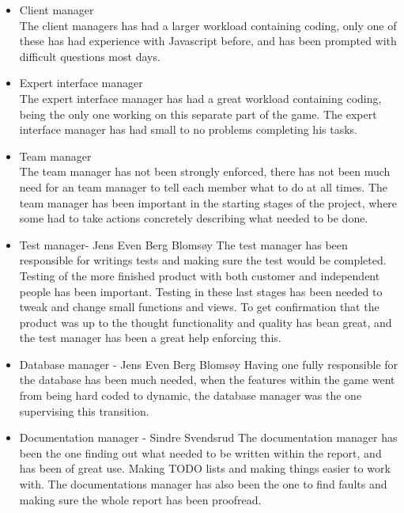 \begin{itemize}
	\item Client manager\\
The client managers has had a larger workload containing coding, only one of these has had experience with Javascript before, and has been prompted with difficult questions most days.
	\item Expert interface manager\\
The expert interface manager has had a great workload containing coding, being the only one working on this separate part of the game. The expert interface manager has had small to no problems completing his tasks.
	\item Team manager\\
The team manager has not been strongly enforced, there has not been much need for an team manager to tell each member what to do at all times. The team manager has been important in the starting stages of the project, where some had to take actions concretely describing what needed to be done. 
	\item Test manager- Jens Even Berg Blomsøy
The test manager has been responsible for writings tests and making sure the test would be completed. Testing of the more finished product with both customer and independent people has been important. Testing in these last stages has been needed to tweak and change small functions and views. To get confirmation that the product was up to the thought functionality and quality has bean great, and the test manager has been a great help enforcing this.
	\item Database manager - Jens Even Berg Blomsøy
Having one fully responsible for the database has been much needed, when the features within the game went from being hard coded to dynamic, the database manager was the one supervising this transition. 
	\item Documentation manager - Sindre Svendsrud
The documentation manager has been the one finding out what needed to be written within the report, and has been of great use. Making TODO lists and making things easier to work with. The documentations manager has also been the one to find faults and making sure the whole report has been proofread.
\end{itemize}


